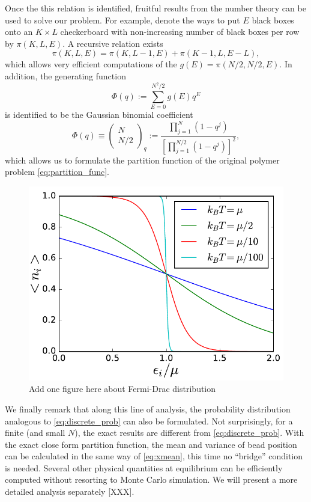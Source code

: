 \documentclass[aps,showpacs,twocolumn,floatfix,prx,superscriptaddress]{revtex4-1}
\begin{document}
Once the this relation is identified, fruitful results from the number theory
\cite{Andrews1998} can be used to solve our problem. For example, denote  the ways to put
$E$ black boxes onto an $K \times L$ checkerboard with non-increasing number of
black boxes per row by $\pi \left(K,L,E\right)$. A recursive relation exists
\cite{Andrews1998}
\begin{equation}
    \pi\left(K,L,E\right) = \pi\left(K,L-1,E\right) + \pi \left(K-1,L, E-L\right),
\end{equation}
which allows very efficient computations of the
$g(E)=\pi\left(N/2,N/2,E\right)$. In addition, the generating function 
\begin{equation}
    \Phi \left(q\right) := \sum_{E=0}^{N^2/2} g(E) q^E
\end{equation}
is identified to be the Gaussian binomial coefficient
\begin{equation}
    \Phi \left(q\right) \equiv \left(\begin{array}{c} N \\ N/2
        \end{array}\right)_q := \frac{\prod_{j=1}^{N}
        \left(1-q^j\right)}{\left[\prod_{j=1}^{N/2} \left(1-q^j\right)\right]^2},
\end{equation}
which allows us to formulate the partition function of the original polymer
problem \eqref{eq:partition_func}. 
\begin{figure}[htpb]
    \centering
    \includegraphics[width=1.0\linewidth]{fermiDrac}
    \caption{Add one figure here about Fermi-Drac distribution}
    \label{fig:fermidrac}
\end{figure}
We finally remark that along this line of analysis, the probability distribution
analogous to \eqref{eq:discrete_prob} can also be formulated. Not surprisingly,
for a finite (and small $N$), the exact results are different from
\eqref{eq:discrete_prob}. With the exact close form partition function, the
mean and variance of bead position can be calculated in the same way of
\eqref{eq:xmean}, this time no ``bridge'' condition is needed. 
Several other physical quantities at equilibrium can
be efficiently computed without resorting to Monte Carlo simulation. We will
present a more detailed analysis separately [XXX].  
\end{document}
